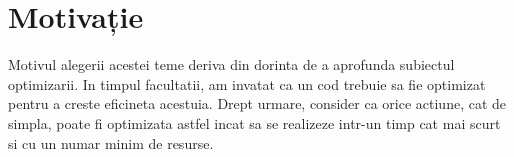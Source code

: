 \chapter*{Motivație} 

Motivul alegerii acestei teme deriva din dorinta de a aprofunda subiectul optimizarii. In timpul facultatii, am invatat ca un cod trebuie sa fie optimizat pentru a creste eficineta acestuia. Drept urmare, consider ca orice actiune, cat de simpla, poate fi optimizata astfel incat sa se realizeze intr-un timp cat mai scurt si cu un numar minim  de resurse.
